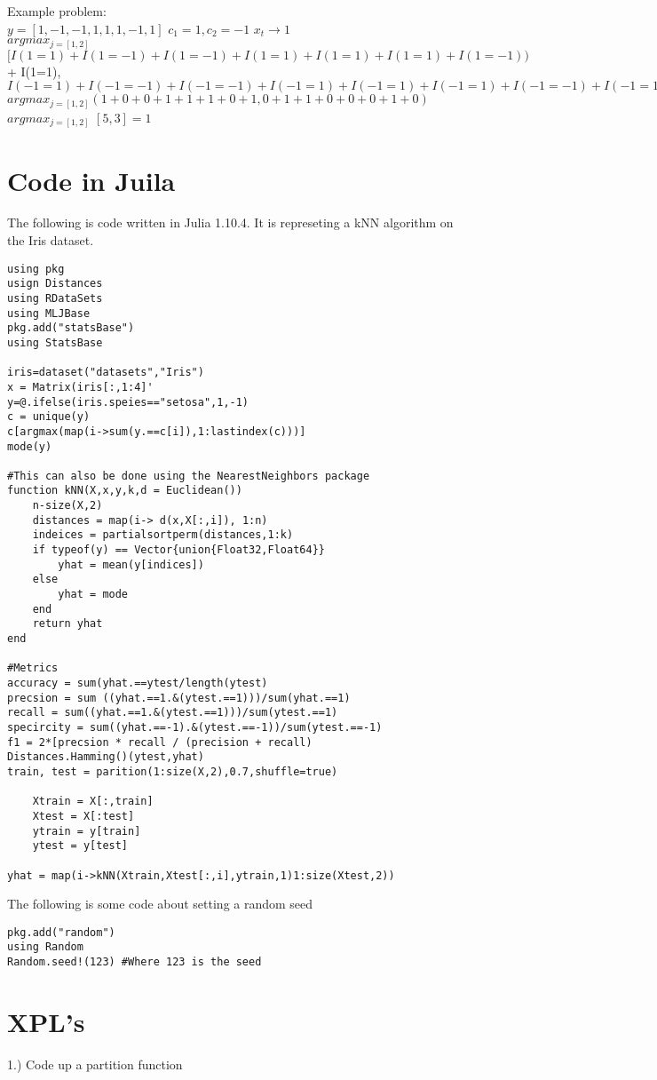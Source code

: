 Example problem: \\
$y=[1,-1,-1,1,1,1,-1,1]$ $c_1=1,c_2=-1$ $x_t \rightarrow 1$ \\
$argmax_{j=[1,2]}$$[I(1=1)+I(1=-1)+I(1=-1)+I(1=1)+I(1=1)+I(1=1)+I(1=-1))$ \\
 + I(1=1), \\
$I(-1=1)+I(-1=-1)+I(-1=-1)+I(-1=1)+I(-1=1)+I(-1=1)+I(-1=-1)+I(-1=1)$ \\
$argmax_{j=[1,2]} (1+0+0+1+1+1+0+1, 0+1+1+0+0+0+1+0)$\\
$argmax_{j=[1,2]}$ $[5,3]=1$


\section{Code in Juila}
The following is code written in Julia 1.10.4. 
It is represeting a kNN algorithm on the Iris dataset.

\begin{lstlisting}
using pkg
usign Distances
using RDataSets
using MLJBase
pkg.add("statsBase")
using StatsBase

iris=dataset("datasets","Iris")
x = Matrix(iris[:,1:4]'
y=@.ifelse(iris.speies=="setosa",1,-1)
c = unique(y)
c[argmax(map(i->sum(y.==c[i]),1:lastindex(c)))]
mode(y)

#This can also be done using the NearestNeighbors package
function kNN(X,x,y,k,d = Euclidean())
    n-size(X,2)
    distances = map(i-> d(x,X[:,i]), 1:n)
    indeices = partialsortperm(distances,1:k)
    if typeof(y) == Vector{union{Float32,Float64}}
        yhat = mean(y[indices])
    else
        yhat = mode
    end
    return yhat
end

#Metrics
accuracy = sum(yhat.==ytest/length(ytest)
precsion = sum ((yhat.==1.&(ytest.==1)))/sum(yhat.==1)
recall = sum((yhat.==1.&(ytest.==1)))/sum(ytest.==1)
specircity = sum((yhat.==-1).&(ytest.==-1))/sum(ytest.==-1)
f1 = 2*[precsion * recall / (precision + recall)
Distances.Hamming()(ytest,yhat)
train, test = parition(1:size(X,2),0.7,shuffle=true)

    Xtrain = X[:,train]
    Xtest = X[:test]
    ytrain = y[train]
    ytest = y[test]

yhat = map(i->kNN(Xtrain,Xtest[:,i],ytrain,1)1:size(Xtest,2))

\end{lstlisting}

The following is some code about setting a random seed
\begin{lstlisting}
pkg.add("random")
using Random
Random.seed!(123) #Where 123 is the seed
\end{lstlisting}


\section{XPL's}
1.) Code up a partition function

